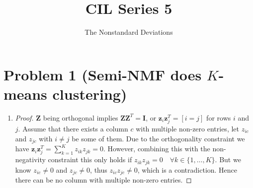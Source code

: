 \documentclass{scrartcl}
\title{CIL Series 5}
\author{The Nonstandard Deviations}
\begin{document}
  \maketitle

  \section{Problem 1 (Semi-NMF does $K$-means clustering)} %
  \label{sec:_problem_1_semi_nmf_does_k_means_clustering_}
    \begin{enumerate}
        \item
          \begin{proof}
            $\mathbf{Z}$ being orthogonal implies $\mathbf{ZZ}^T = \mathbf{I}$,
            or $\mathbf{z}_i \mathbf{z}_j^T = [i = j]$ for rows $i$ and $j$.
            Assume that there exists a column $c$ with multiple non-zero entries, let
            $z_{ic}$ and $z_{jc}$ with $i \neq j$ be some of them. Due to the
            orthogonality constraint we have $\mathbf{z}_i \mathbf{z}_j^T = \sum_{k=1}^K
            z_{ik}z_{jk} = 0$. However, combining this with the non-negativity
            constraint this only holds if $z_{ik}z_{jk} = 0 \quad \forall k \in \{1,\dots,K\}$.
            But we know $z_{ic} \neq 0$ and $z_{jc} \neq 0$, thus $z_{ic}z_{jc} \neq 0$,
            which is a contradiction. Hence there can be no column with multiple
            non-zero entries.
          \end{proof}
      \end{enumerate}
\end{document}
